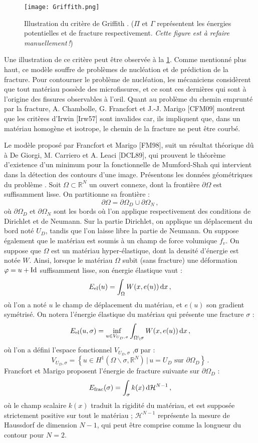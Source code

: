 \begin{figure}[!ht]
    \centering
    \texttt{[image: Griffith.png]}
    \caption{Illustration du critère de Griffith \parencite{gross2017fracture}. ($\Pi$ et $\Gamma$ représentent les énergies potentielles et de fracture respectivement. \textit{Cette figure est à refaire manuellement !})}
    \label{fig:Griffith}
\end{figure}
Une illustration de ce critère peut être observée à la \cref{fig:Griffith}. Comme mentionné plus haut, ce modèle souffre de problèmes de nucléation et de prédiction de la fracture. Pour contourner le problème de nucléation, les mécaniciens considèrent que tout matériau possède des microfissures, et ce sont ces dernières qui sont à l'origine des fissures observables à l'\oe{}il. Quant au problème du chemin emprunté par la fracture, A. Chambolle, G. Francfort et J.-J. Marigo [CFM09] montrent que les critères d'Irwin [Irw57] sont invalides car, ils impliquent que, dans un matériau homogène et isotrope, le chemin de la fracture ne peut être courbé.

Le modèle proposé par Francfort et Marigo [FM98], suit un résultat théorique dû à De Giorgi, M. Carriero et A. Leaci [DCL89], qui prouvent le théorème d’existence d'un minimum pour la fonctionnelle de Mumford-Shah qui intervient dans la détection des contours d’une image. Présentons les données géométriques du problème \parencite[p.35]{balasoiu2020thesis}. Soit $\Omega \subset \mathbb{R}^N$ un ouvert connexe, dont la frontière $\partial \Omega$ est suffisamment lisse. On partitionne sa frontière :
$$
\partial \Omega = \partial \Omega_D \cup  \partial \Omega_N \,,
$$
où $\partial \Omega_D$ et $\partial \Omega_N$ sont les bords où l’on applique respectivement des conditions de Dirichlet et de Neumann. Sur la partie Dirichlet, on applique un déplacement du bord noté $U_D$, tandis que l’on laisse libre la partie de Neumann. On suppose également que le matériau est soumis à un champ de force volumique $f_v$. On suppose que $\Omega$ est un matériau hyper-élastique, dont la densité d’énergie est notée $W$. Ainsi, lorsque le matériau $\Omega$ subit (sans fracture) une déformation $\varphi = u + \text{Id}$ suffisamment lisse, son énergie élastique vaut :
$$
\eel(u) = \int_{\Omega} W(x,e(u)) \diff x \,,
$$
où l’on a noté $u$ le champ de déplacement du matériau, et $e(u)$ son gradient symétrisé. On notera l’énergie élastique du matériau qui présente une fracture $\sigma$ :
$$
\eel(u,\sigma) = \inf_{u\in V_{U_D, \sigma}}{\int_{\Omega \backslash \sigma} W(x,e(u)) \diff x} \,,
$$
où l’on a défini l’espace fonctionnel $V_{U_D,\sigma}$ ,σ par :
$$
V_{U_D,\sigma} = \left\{ u \in H^1(\Omega \backslash \sigma, \mathbb{R}^N) \, \rvert \, u = U_D \text{ sur } \partial \Omega_D \right\} \,.
$$
Francfort et Marigo proposent l’énergie de fracture suivante sur $\partial \Omega_D$ :
$$
\efrac(\sigma) = \int_{\sigma} k(x) \diff \mathcal{H}^{N-1} \,,
$$
où le champ scalaire $k(x)$ traduit la rigidité du matériau, et est supposée strictement positive sur tout le matériau ; $\mathcal{H}^{N-1}$ représente la mesure de Haussdorf de dimension $N-1$, qui peut être comprise comme la longueur du contour pour $N=2$.

